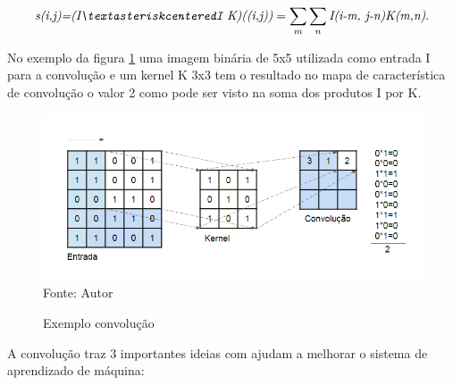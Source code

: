 \documentclass[
	12pt,				%
    oneside,			%
	a4paper,			%
	english,			%
	french,				%
	spanish,			%
	brazil,				%
	]{abntex2}
\begin{document}
\begin{equation}
\centering
    \textit{s(i,j)=(I\textasteriskcenteredI K)((i,j))} = \sum_{m} \sum_{n} \textit{I(i-m, j-n)K(m,n)} .
    \label{eq:convolucao3}
\end{equation}


No exemplo da figura \ref{fig:convolução} uma imagem binária de 5x5 utilizada como entrada I para a convolução e um kernel K 3x3 tem o resultado no mapa de característica de convolução o valor 2 como pode ser visto na soma dos produtos I por K.

\begin{figure}[H]
    \centering
    \caption{Exemplo convolução}
    \includegraphics[scale=0.65]{convolucao1}\\
    Fonte: Autor\hfill
    \label{fig:convolução}
\end{figure}

A convolução traz 3 importantes ideias com ajudam a melhorar o sistema de aprendizado de máquina:
\end{document}
